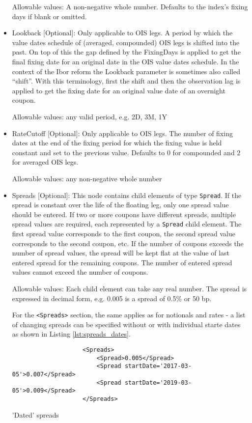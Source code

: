 \begin{itemize}
  Allowable values: A non-negative whole number.  Defaults to the index's fixing days if blank or omitted.

\item Lookback [Optional]: Only applicable to OIS legs. A period by which the value dates schedule of (averaged,
  compounded) OIS legs is shifted into the past. On top of this the gap defined by the FixingDays is applied to get the
  final fixing date for an original date in the OIS value dates schedule. In the context of the Ibor reform the Lookback
  parameter is sometimes also called ``shift''. With this terminology, first the shift and then the observation lag is
  applied to get the fixing date for an original value date of an overnight coupon.

  Allowable values: any valid period, e.g. 2D, 3M, 1Y

\item RateCutoff [Optional]: Only applicable to OIS legs. The number of fixing dates at the end of the fixing period for
  which the fixing value is held constant and set to the previous value. Defaults to $0$ for compounded and $2$ for
  averaged OIS legs.

Allowable values: any non-negative whole number

\item Spreads [Optional]: This node contains child elements of type
  \lstinline!Spread!. If the spread is constant over the life of the
  floating leg, only one spread value should be entered. If two or more
  coupons have different spreads, multiple spread values are required,
  each represented by a \lstinline!Spread! child element. The first
  spread value corresponds to the first coupon, the second spread
  value corresponds to the second coupon, etc. If the number of
  coupons exceeds the number of spread values, the spread will be kept
  flat at the value of last entered spread for the remaining coupons.
  The number of entered spread values cannot exceed the number of
  coupons. 

  Allowable values: Each child element can take any real number. The spread is expressed in decimal form, e.g. 0.005 is
  a spread of 0.5\% or 50 bp. 

For the {\tt <Spreads>} section, the same applies as for notionals and
rates - a list of changing spreads can be specified without or with individual starte dates as shown
in Listing \ref{lst:spreads_dates}.
\begin{listing}[H]
\begin{verbatim}
                    <Spreads>
                        <Spread>0.005</Spread>
                        <Spread startDate='2017-03-05'>0.007</Spread>
                        <Spread startDate='2019-03-05'>0.009</Spread>
                    </Spreads>
\end{verbatim}
\caption{'Dated' spreads}
\label{lst:spreads_dates}
\end{listing}


\end{itemize}
